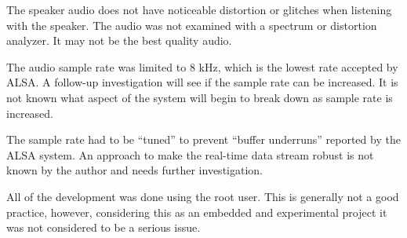 The speaker audio does not have noticeable distortion or glitches when listening with the speaker.  The audio was not examined with a spectrum or distortion analyzer.  It may not be the best quality audio.

The audio sample rate was limited to 8 kHz, which is the lowest rate accepted by ALSA.  A follow-up investigation will see if the sample rate can be increased.  It is not known what aspect of the system will begin to break down as sample rate is increased.

The sample rate had to be ``tuned'' to prevent ``buffer underruns'' reported by the ALSA system.  An approach to make the real-time data stream robust is not known by the author and needs further investigation.

All of the development was done using the root user.  This is generally not a good practice, however, considering this as an embedded and experimental project it was not considered to be a serious issue.


